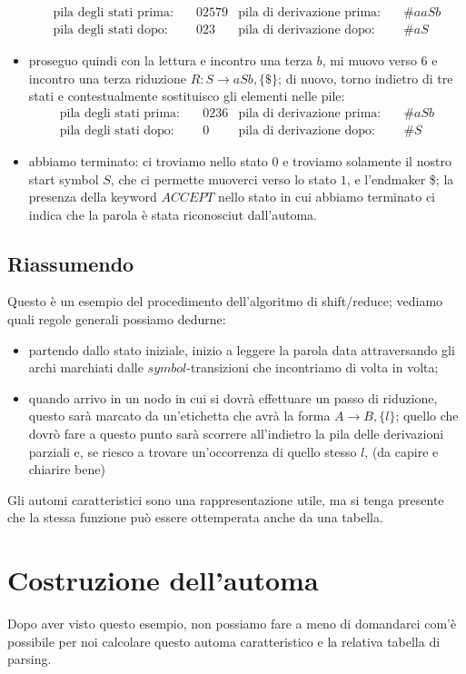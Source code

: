 \documentclass[class=book, crop=false, oneside, 12pt]{standalone}
\begin{document}
\begin{itemize}
\begin{align*}
        \textrm{pila degli stati prima:} &\quad 02579 & \textrm{pila di derivazione prima:} &\quad \#aaSb \\
        \textrm{pila degli stati dopo:} &\quad 023 & \textrm{pila di derivazione dopo:} &\quad \#aS
    \end{align*}
    \item proseguo quindi con la lettura e incontro una terza \(b\), mi muovo verso \(6\) e incontro una terza riduzione \(R: S \to aSb, \{\$\}\); di nuovo, torno indietro di tre stati e contestualmente sostituisco gli elementi nelle pile: 
    \begin{align*}
        \textrm{pila degli stati prima:} &\quad 0236 & \textrm{pila di derivazione prima:} &\quad \#aSb \\
        \textrm{pila degli stati dopo:} &\quad 0 & \textrm{pila di derivazione dopo:} &\quad \#S
    \end{align*}
    \item abbiamo terminato: ci troviamo nello stato \(0\) e troviamo solamente il nostro start symbol \(S\), che ci permette  muoverci verso lo stato \(1\), e l'endmaker \$; la presenza della keyword \(ACCEPT\) nello stato in cui abbiamo terminato ci indica che la parola è stata riconosciut dall'automa.
\end{itemize}

\subsection{Riassumendo}
Questo è un esempio del procedimento dell'algoritmo di shift/reduce; vediamo quali regole generali possiamo dedurne:
\begin{itemize}
    \item partendo dallo stato iniziale, inizio a leggere la parola data attraversando gli archi marchiati dalle \(symbol\)-transizioni che incontriamo di volta in volta;
    \item quando arrivo in un nodo in cui si dovrà effettuare un passo di riduzione, questo sarà marcato da un'etichetta che avrà la forma \(A \to B, \{l\}\); quello che dovrò fare a questo punto sarà scorrere all'indietro la pila delle derivazioni parziali e, se riesco a trovare un'occorrenza di quello stesso \(l\), (da capire e chiarire bene)
\end{itemize}
Gli automi caratteristici sono una rappresentazione utile, ma si tenga presente che la stessa funzione può essere ottemperata anche da una tabella.

\section{Costruzione dell'automa}
Dopo aver visto questo esempio, non possiamo fare a meno di domandarci com'è possibile per noi calcolare questo automa caratteristico e la relativa tabella di parsing.
\end{document}
